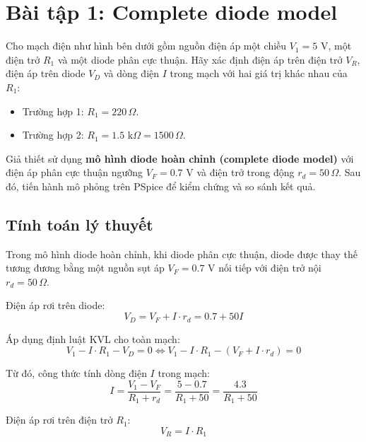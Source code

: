 \section{Bài tập 1: Complete diode model}

Cho mạch điện như hình bên dưới gồm nguồn điện áp một chiều $V_1 = 5\text{ V}$, một điện trở $R_1$ và một diode phân cực thuận. Hãy xác định điện áp trên điện trở $V_R$, điện áp trên diode $V_D$ và dòng điện $I$ trong mạch với hai giá trị khác nhau của $R_1$:
\begin{itemize}[leftmargin=1.5em]
  \item Trường hợp 1: $R_1 = 220\,\Omega$.
  \item Trường hợp 2: $R_1 = 1.5\text{ k}\Omega = 1500\,\Omega$.
\end{itemize}


Giả thiết sử dụng \textbf{mô hình diode hoàn chỉnh (complete diode model)} với điện áp phân cực thuận ngưỡng $V_F = 0.7\text{ V}$ và điện trở trong động $r_d = 50\,\Omega$. Sau đó, tiến hành mô phỏng trên PSpice để kiểm chứng và so sánh kết quả.

\subsection{Tính toán lý thuyết}
Trong mô hình diode hoàn chỉnh, khi diode phân cực thuận, diode được thay thế tương đương bằng một nguồn sụt áp $V_F = 0.7\text{ V}$ nối tiếp với điện trở nội $r_d = 50\,\Omega$.

\noindent Điện áp rơi trên diode:
\begin{equation}
  V_D = V_F + I \cdot r_d = 0.7 + 50I \label{eq:ex1_vd}
\end{equation}

\noindent Áp dụng định luật KVL cho toàn mạch:
\begin{equation}
  V_1 - I \cdot R_1 - V_D = 0 \iff V_1 - I \cdot R_1 - (V_F + I \cdot r_d) = 0
\end{equation}

\noindent Từ đó, công thức tính dòng điện $I$ trong mạch:
\begin{equation}
  I = \frac{V_1 - V_F}{R_1 + r_d} = \frac{5 - 0.7}{R_1 + 50} = \frac{4.3}{R_1 + 50}
\end{equation}

\noindent Điện áp rơi trên điện trở $R_1$:
\begin{equation}
  V_R = I \cdot R_1
\end{equation}

